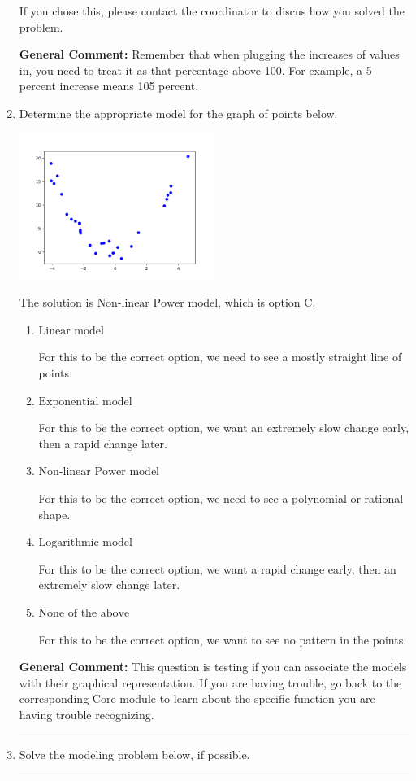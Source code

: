 \documentclass{extbook}[14pt]
\newcommand{\litem}[1]{\item #1

\rule{\textwidth}{0.4pt}}
\begin{document}
\begin{enumerate}
{\begin{enumerate}[label=\Alph*.]
If you chose this, please contact the coordinator to discus how you solved the problem.
\end{enumerate}

\textbf{General Comment:} Remember that when plugging the increases of values in, you need to treat it as that percentage above 100. For example, a 5 percent increase means 105 percent.
}
\litem{
Determine the appropriate model for the graph of points below.

\begin{center}
    \includegraphics[width=0.5\textwidth]{../Figures/identifyModelGraph12CopyA.png}
\end{center}


The solution is \( \text{Non-linear Power model} \), which is option C.\begin{enumerate}[label=\Alph*.]
\item \( \text{Linear model} \)

For this to be the correct option, we need to see a mostly straight line of points.
\item \( \text{Exponential model} \)

For this to be the correct option, we want an extremely slow change early, then a rapid change later.
\item \( \text{Non-linear Power model} \)

For this to be the correct option, we need to see a polynomial or rational shape.
\item \( \text{Logarithmic model} \)

For this to be the correct option, we want a rapid change early, then an extremely slow change later.
\item \( \text{None of the above} \)

For this to be the correct option, we want to see no pattern in the points.
\end{enumerate}

\textbf{General Comment:} This question is testing if you can associate the models with their graphical representation. If you are having trouble, go back to the corresponding Core module to learn about the specific function you are having trouble recognizing.
}
\litem{
Solve the modeling problem below, if possible.

}
\end{enumerate}
\end{document}
